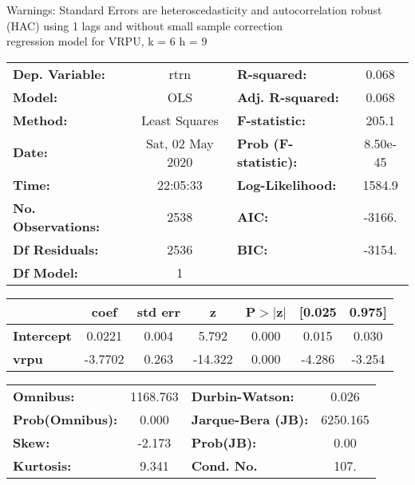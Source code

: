 Warnings: \newline
 [1] Standard Errors are heteroscedasticity and autocorrelation robust (HAC) using 1 lags and without small sample correction\\ 

regression model for VRPU, k = 6 h = 9\begin{center}
\begin{tabular}{lclc}
\toprule
\textbf{Dep. Variable:}    &       rtrn       & \textbf{  R-squared:         } &     0.068   \\
\textbf{Model:}            &       OLS        & \textbf{  Adj. R-squared:    } &     0.068   \\
\textbf{Method:}           &  Least Squares   & \textbf{  F-statistic:       } &     205.1   \\
\textbf{Date:}             & Sat, 02 May 2020 & \textbf{  Prob (F-statistic):} &  8.50e-45   \\
\textbf{Time:}             &     22:05:33     & \textbf{  Log-Likelihood:    } &    1584.9   \\
\textbf{No. Observations:} &        2538      & \textbf{  AIC:               } &    -3166.   \\
\textbf{Df Residuals:}     &        2536      & \textbf{  BIC:               } &    -3154.   \\
\textbf{Df Model:}         &           1      & \textbf{                     } &             \\
\bottomrule
\end{tabular}
\begin{tabular}{lcccccc}
                   & \textbf{coef} & \textbf{std err} & \textbf{z} & \textbf{P$> |$z$|$} & \textbf{[0.025} & \textbf{0.975]}  \\
\midrule
\textbf{Intercept} &       0.0221  &        0.004     &     5.792  &         0.000        &        0.015    &        0.030     \\
\textbf{vrpu}      &      -3.7702  &        0.263     &   -14.322  &         0.000        &       -4.286    &       -3.254     \\
\bottomrule
\end{tabular}
\begin{tabular}{lclc}
\textbf{Omnibus:}       & 1168.763 & \textbf{  Durbin-Watson:     } &    0.026  \\
\textbf{Prob(Omnibus):} &   0.000  & \textbf{  Jarque-Bera (JB):  } & 6250.165  \\
\textbf{Skew:}          &  -2.173  & \textbf{  Prob(JB):          } &     0.00  \\
\textbf{Kurtosis:}      &   9.341  & \textbf{  Cond. No.          } &     107.  \\
\bottomrule
\end{tabular}
\end{center}

